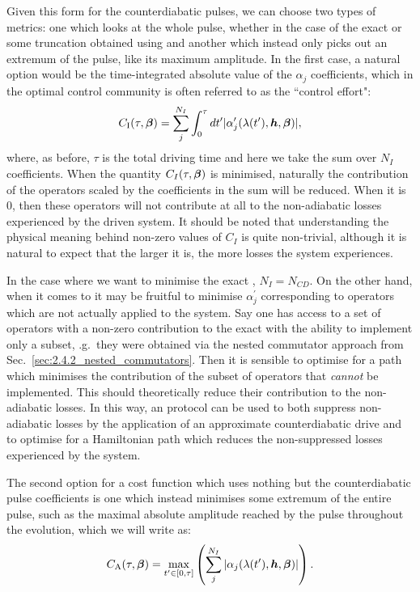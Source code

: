 Given this form for the counterdiabatic pulses, we can choose two types of metrics: one which looks at the whole pulse, whether in the case of the exact  or some truncation obtained using  and another which instead only picks out an extremum of the pulse, like its maximum amplitude. In the first case, a natural option would be the time-integrated absolute value of the $\alpha_j$ coefficients, which in the optimal control community is often referred to as the ``control effort"\cite{petersen_control_1987}:
\begin{equation}\label{eq:COLD_costfunc_integral}
    C_{\rm I}(\tau, \boldsymbol{\beta}) = \sum_j^{N_I} \int_{0}^{\tau} dt^{\prime} |\alpha_j^{\prime}(\lambda(t^{\prime}), \boldsymbol{h}, \boldsymbol{\beta})|,
\end{equation}
where, as before, $\tau$ is the total driving time and here we take the sum over $N_I$ coefficients. When the quantity $C_I(\tau, \boldsymbol{\beta})$ is minimised, naturally the contribution of the operators scaled by the coefficients in the sum will be reduced. When it is $0$, then these operators will not contribute at all to the non-adiabatic losses experienced by the driven system. It should be noted that understanding the physical meaning behind non-zero values of $C_I$ is quite non-trivial, although it is natural to expect that the larger it is, the more losses the system experiences. 

In the case where we want to minimise the exact , $N_I = N_{CD}$. On the other hand, when it comes to  it may be fruitful to minimise $\alpha_j^{\prime}$ corresponding to operators which are not actually applied to the system. Say one has access to a set of operators with a non-zero contribution to the exact  with the ability to implement only a subset, \@e.g.~they were obtained via the nested commutator approach from Sec.~\ref{sec:2.4.2_nested_commutators}. Then it is sensible to optimise for a path which minimises the contribution of the subset of operators that \emph{cannot} be implemented. This should theoretically reduce their contribution to the non-adiabatic losses. In this way, an  protocol can be used to both suppress non-adiabatic losses by the application of an approximate counterdiabatic drive and to optimise for a Hamiltonian path which reduces the non-suppressed losses experienced by the system.

The second option for a cost function which uses nothing but the counterdiabatic pulse coefficients is one which instead minimises some extremum of the entire pulse, such as the maximal absolute amplitude reached by the pulse throughout the evolution, which we will write as:
\begin{equation}\label{eq:COLD_costfunc_maximum}
    C_{\rm A}(\tau, \boldsymbol{\beta}) = \max_{t^{\prime} \in [0,\tau]} \left( \sum_j^{N_I} | \alpha_j(\lambda(t^{\prime}), \boldsymbol{h}, \boldsymbol{\beta})|\right).
\end{equation}

